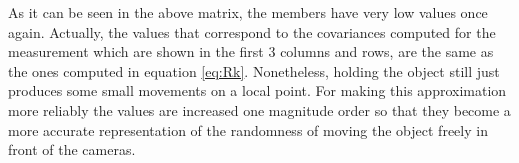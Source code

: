 As it can be seen in the above matrix, the members have very low values once again. Actually, the values that correspond to the covariances computed for the measurement which are shown in the first 3 columns and rows, are the same as the ones computed in equation \ref{eq:Rk}. 
Nonetheless, holding the object still just produces some small movements on a local point. For making this approximation more reliably the values are increased one magnitude order so that they become a more accurate representation of the randomness of moving the object freely in front of the cameras.


